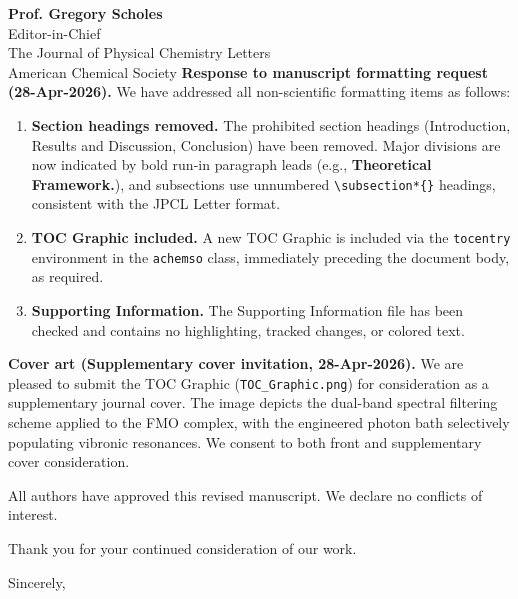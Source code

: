\documentclass[11pt,a4paper]{letter}
\begin{document}
\begin{letter}{
\textbf{Prof. Gregory Scholes}\\
Editor-in-Chief\\
The Journal of Physical Chemistry Letters\\
American Chemical Society
}
\textbf{Response to manuscript formatting request (28-Apr-2026).}
We have addressed all non-scientific formatting items as follows:
\begin{enumerate}
\item \textbf{Section headings removed.} The prohibited section headings (Introduction, Results and Discussion, Conclusion) have been removed. Major divisions are now indicated by bold run-in paragraph leads (e.g., \textbf{Theoretical Framework.}), and subsections use unnumbered \texttt{\textbackslash subsection*\{\}} headings, consistent with the JPCL Letter format.
\item \textbf{TOC Graphic included.} A new TOC Graphic is included via the \texttt{tocentry} environment in the \texttt{achemso} class, immediately preceding the document body, as required.
\item \textbf{Supporting Information.} The Supporting Information file has been checked and contains no highlighting, tracked changes, or colored text.
\end{enumerate}

\textbf{Cover art (Supplementary cover invitation, 28-Apr-2026).}
We are pleased to submit the TOC Graphic (\texttt{TOC\_Graphic.png}) for consideration as a supplementary journal cover. The image depicts the dual-band spectral filtering scheme applied to the FMO complex, with the engineered photon bath selectively populating vibronic resonances. We consent to both front and supplementary cover consideration.

All authors have approved this revised manuscript. We declare no conflicts of interest.

Thank you for your continued consideration of our work.

\closing{Sincerely,}


\end{letter}
\end{document}
